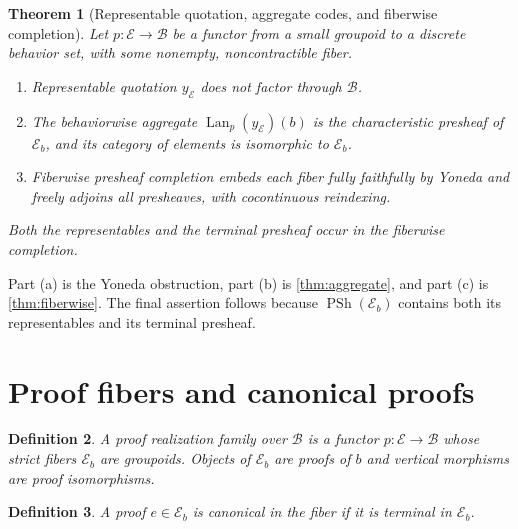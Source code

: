\documentclass[12pt,a4paper,twoside]{extarticle}
\makeatletter
\theoremstyle{compactplain}
\newtheorem{theorem}{Theorem}[section]
\theoremstyle{compactdef}
\newtheorem{definition}[theorem]{Definition}
\renewenvironment{proof}[1][\proofname]{\par\pushQED{\qed}\normalfont
  \topsep2pt\trivlist\item[\hskip\labelsep\bfseries #1\@addpunct{.}]\ignorespaces}
 {\popQED\endtrivlist\@endpefalse}
\newcommand{\PSh}{\operatorname{PSh}}
\newcommand{\Lan}{\operatorname{Lan}}
\makeatother
\begin{document}
\begin{theorem}[Representable quotation, aggregate codes, and fiberwise completion]\label{thm:three-levels}
Let $p:\mathcal E\to\mathcal B$ be a functor from a small groupoid to a discrete behavior set, with some nonempty, noncontractible fiber.
\begin{enumerate}[label=(\alph*)]
\item Representable quotation $y_{\mathcal E}$ does not factor through $\mathcal B$.
\item The behaviorwise aggregate $\Lan_p(y_{\mathcal E})(b)$ is the characteristic presheaf of $\mathcal E_b$, and its category of elements is isomorphic to $\mathcal E_b$.
\item Fiberwise presheaf completion embeds each fiber fully faithfully by Yoneda and freely adjoins all presheaves, with cocontinuous reindexing.
\end{enumerate}
Both the representables and the terminal presheaf occur in the fiberwise completion.
\end{theorem}
\begin{proof}
Part (a) is the Yoneda obstruction, part (b) is \cref{thm:aggregate}, and part (c) is \cref{thm:fiberwise}. The final assertion follows because $\PSh(\mathcal E_b)$ contains both its representables and its terminal presheaf.
\end{proof}
\section{Proof fibers and canonical proofs}

\begin{definition}
A proof realization family over $\mathcal B$ is a functor $p:\mathcal E\to\mathcal B$ whose strict fibers $\mathcal E_b$ are groupoids. Objects of $\mathcal E_b$ are proofs of $b$ and vertical morphisms are proof isomorphisms.
\end{definition}

\begin{definition}
A proof $e\in\mathcal E_b$ is canonical in the fiber if it is terminal in $\mathcal E_b$.
\end{definition}
\end{document}
